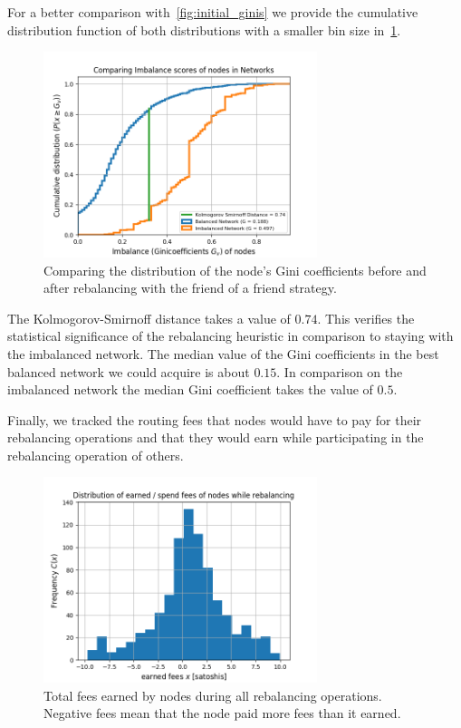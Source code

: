 \documentclass[conference]{IEEEtran}
\begin{document}
For a better comparison with~\cref{fig:initial_ginis} we provide the cumulative distribution function of both distributions with a smaller bin size in~\cref{fig:cdf_gini}.

\begin{figure}
 \centering
 \includegraphics[width=8cm]{code/vs/fig/comparison distribution of Ginicoefficients.png}
 \caption{Comparing the distribution of the node's Gini coefficients before and after rebalancing with the friend of a friend strategy.}
 \label{fig:cdf_gini}
 \end{figure}

The Kolmogorov-Smirnoff distance takes a value of $0.74$.
This verifies the statistical significance of the rebalancing heuristic in comparison to staying with the imbalanced network.
The median value of the Gini coefficients in the best balanced network we could acquire is about $0.15$.
In comparison on the imbalanced network the median Gini coefficient takes the value of $0.5$.

Finally, we tracked the routing fees that nodes would have to pay for their rebalancing operations and that they would earn while participating in the rebalancing operation of others.
 \begin{figure}
 \centering
 \includegraphics[width=8cm]{code/vs/fig/distribution_of_fees.png}
 \caption{Total fees earned by nodes during all rebalancing operations. Negative fees mean that the node paid more fees than it earned.}
 \label{fig:fees}
 \end{figure}
\end{document}
